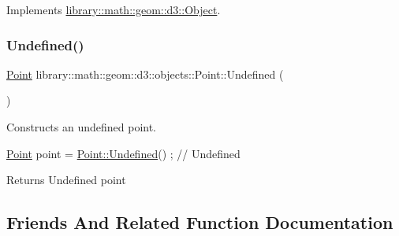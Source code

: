 Implements \hyperlink{classlibrary_1_1math_1_1geom_1_1d3_1_1_object_a989723a27a7d5f6739e45ea695a6c7ed}{library\+::math\+::geom\+::d3\+::\+Object}.

\mbox{\label{classlibrary_1_1math_1_1geom_1_1d3_1_1objects_1_1_point_a7c4c9c71f9b29b85925d8a7ed4943501}} 
\subsubsection{\texorpdfstring{Undefined()}{Undefined()}}
{\footnotesize\ttfamily \hyperlink{classlibrary_1_1math_1_1geom_1_1d3_1_1objects_1_1_point}{Point} library\+::math\+::geom\+::d3\+::objects\+::\+Point\+::\+Undefined (\begin{DoxyParamCaption}{ }\end{DoxyParamCaption})\hspace{0.3cm}{\ttfamily [static]}}



Constructs an undefined point. 


\begin{DoxyCode}
\hyperlink{classlibrary_1_1math_1_1geom_1_1d3_1_1objects_1_1_point_a617e690ab6091af3de729cee337e309e}{Point} point = \hyperlink{classlibrary_1_1math_1_1geom_1_1d3_1_1objects_1_1_point_a7c4c9c71f9b29b85925d8a7ed4943501}{Point::Undefined}() ; \textcolor{comment}{// Undefined}
\end{DoxyCode}


\begin{DoxyReturn}{Returns}
Undefined point 
\end{DoxyReturn}


\subsection{Friends And Related Function Documentation}
\mbox{\label{classlibrary_1_1math_1_1geom_1_1d3_1_1objects_1_1_point_ac6c8450721254f3cefdea7dcdd5f5001}} 
